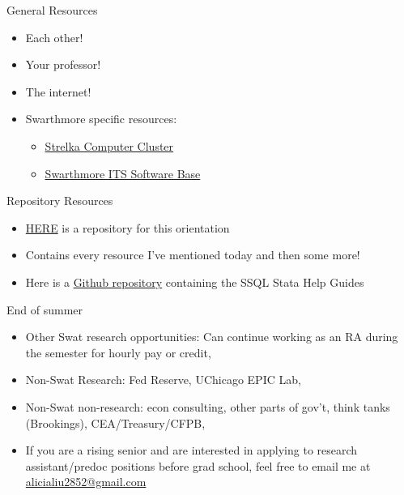 \documentclass{beamer}
\begin{document}
\begin{frame}{General Resources}
    \begin{itemize}
        \item Each other!
        \item Your professor!
        \item The internet!
        \item Swarthmore specific resources: 
        \begin{itemize}
            \item \href{https://swatkb.atlassian.net/wiki/spaces/ACADTECH/pages/20910101/Strelka+Computer+Cluster}{Strelka Computer Cluster}
            \item \href{https://swatkb.atlassian.net/wiki/spaces/SW/pages/20774921/Software+Installers}{Swarthmore ITS Software Base}
        \end{itemize}
    \end{itemize}
\end{frame}

\begin{frame}{Repository Resources}
    \begin{itemize}
        \item \href{https://github.com/alicialiu2852/ra_orientation_s24/tree/main}{HERE} is a repository for this orientation
        \item Contains every resource I've mentioned today and then some more!
        \item Here is a \href{https://github.com/alicialiu2852/ssql_stata_help_guides}{Github repository} containing the SSQL Stata Help Guides
    \end{itemize}
\end{frame}

\begin{frame}{End of summer}
\begin{itemize}
    \item Other Swat research opportunities: Can continue working as an RA during the semester for hourly pay or credit, 
    \item Non-Swat Research: Fed Reserve, UChicago EPIC Lab, 
    \item Non-Swat non-research: econ consulting, other parts of gov't, think tanks (Brookings), CEA/Treasury/CFPB,
    \item If you are a rising senior and are interested in applying to research assistant/predoc positions before grad school, feel free to email me at  \href{mailto:alicialiu2852@gmail.com}{alicialiu2852@gmail.com}
\end{itemize}
\end{frame}
\end{document}
